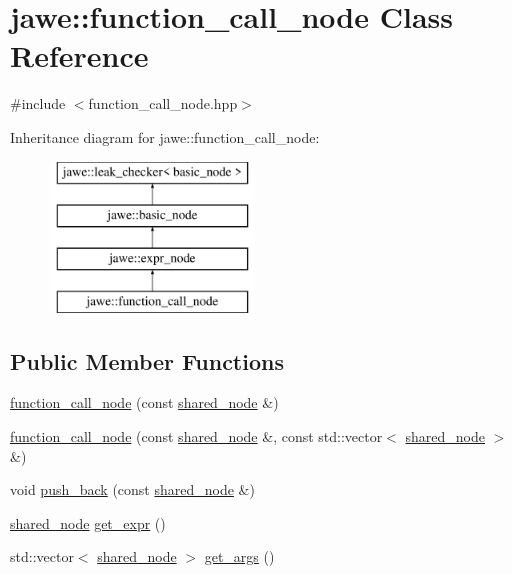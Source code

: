 \hypertarget{classjawe_1_1function__call__node}{}\section{jawe\+:\+:function\+\_\+call\+\_\+node Class Reference}
\label{classjawe_1_1function__call__node}


{\ttfamily \#include $<$function\+\_\+call\+\_\+node.\+hpp$>$}

Inheritance diagram for jawe\+:\+:function\+\_\+call\+\_\+node\+:\begin{figure}[H]
\begin{center}
\leavevmode
\includegraphics[height=4.000000cm]{classjawe_1_1function__call__node}
\end{center}
\end{figure}
\subsection*{Public Member Functions}
\begin{DoxyCompactItemize}
\item 
\hyperlink{classjawe_1_1function__call__node_a2c3a421053dc63b17efef188f4460c19}{function\+\_\+call\+\_\+node} (const \hyperlink{namespacejawe_a3f307481d921b6cbb50cc8511fc2b544}{shared\+\_\+node} \&)
\item 
\hyperlink{classjawe_1_1function__call__node_afdec8b2a9ab5db923eac27653e50a5f7}{function\+\_\+call\+\_\+node} (const \hyperlink{namespacejawe_a3f307481d921b6cbb50cc8511fc2b544}{shared\+\_\+node} \&, const std\+::vector$<$ \hyperlink{namespacejawe_a3f307481d921b6cbb50cc8511fc2b544}{shared\+\_\+node} $>$ \&)
\item 
void \hyperlink{classjawe_1_1function__call__node_a1eb6906152cb0372b5e13da9106afe4b}{push\+\_\+back} (const \hyperlink{namespacejawe_a3f307481d921b6cbb50cc8511fc2b544}{shared\+\_\+node} \&)
\item 
\hyperlink{namespacejawe_a3f307481d921b6cbb50cc8511fc2b544}{shared\+\_\+node} \hyperlink{classjawe_1_1function__call__node_ab9ce2d744923acc3d323605b155d4d78}{get\+\_\+expr} ()
\item 
std\+::vector$<$ \hyperlink{namespacejawe_a3f307481d921b6cbb50cc8511fc2b544}{shared\+\_\+node} $>$ \hyperlink{classjawe_1_1function__call__node_a9c8b1370713757589fc05f68eb14aa3e}{get\+\_\+args} ()
\end{DoxyCompactItemize}
